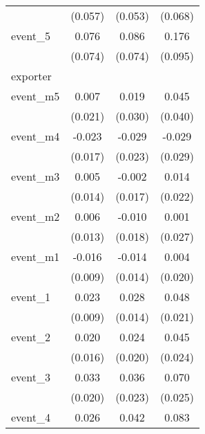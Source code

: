 {\begin{tabular}{l*{3}{c}}
            &     (0.057)         &     (0.053)         &     (0.068)         \\
[1em]
event\_5     &       0.076         &       0.086         &       0.176         \\
            &     (0.074)         &     (0.074)         &     (0.095)         \\
\hline
exporter    &                     &                     &                     \\
event\_m5    &       0.007         &       0.019         &       0.045         \\
            &     (0.021)         &     (0.030)         &     (0.040)         \\
[1em]
event\_m4    &      -0.023         &      -0.029         &      -0.029         \\
            &     (0.017)         &     (0.023)         &     (0.029)         \\
[1em]
event\_m3    &       0.005         &      -0.002         &       0.014         \\
            &     (0.014)         &     (0.017)         &     (0.022)         \\
[1em]
event\_m2    &       0.006         &      -0.010         &       0.001         \\
            &     (0.013)         &     (0.018)         &     (0.027)         \\
[1em]
event\_m1    &      -0.016         &      -0.014         &       0.004         \\
            &     (0.009)         &     (0.014)         &     (0.020)         \\
[1em]
event\_1     &       0.023\sym{**} &       0.028         &       0.048\sym{*}  \\
            &     (0.009)         &     (0.014)         &     (0.021)         \\
[1em]
event\_2     &       0.020         &       0.024         &       0.045         \\
            &     (0.016)         &     (0.020)         &     (0.024)         \\
[1em]
event\_3     &       0.033         &       0.036         &       0.070\sym{**} \\
            &     (0.020)         &     (0.023)         &     (0.025)         \\
[1em]
event\_4     &       0.026         &       0.042\sym{*}  &       0.083\sym{**} \\

\end{tabular}}
